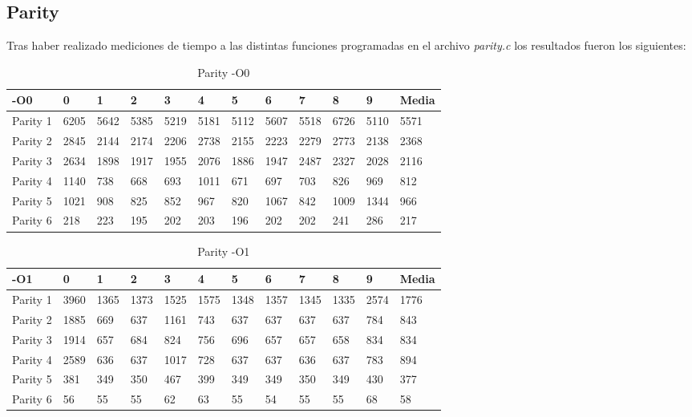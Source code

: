 \newpage

\subsection*{Parity}

\begin{flushleft}
  Tras haber realizado mediciones de tiempo a las distintas funciones
  programadas en el archivo \textit{parity.c} los resultados fueron los
  siguientes:
\end{flushleft}

\begin{table}[!htbp]
\centering
\caption{Parity -O0}
\label{my-label}
\begin{tabular}{|l|l|l|l|l|l|l|l|l|l|l|l|}\hline
-O0      & 0    & 1    & 2    & 3    & 4    & 5    & 6    & 7    & 8    & 9    & Media \\\hline
Parity 1 & 6205 & 5642 & 5385 & 5219 & 5181 & 5112 & 5607 & 5518 & 6726 & 5110 & 5571  \\\hline
Parity 2 & 2845 & 2144 & 2174 & 2206 & 2738 & 2155 & 2223 & 2279 & 2773 & 2138 & 2368  \\\hline
Parity 3 & 2634 & 1898 & 1917 & 1955 & 2076 & 1886 & 1947 & 2487 & 2327 & 2028 & 2116  \\\hline
Parity 4 & 1140 & 738  & 668  & 693  & 1011 & 671  & 697  & 703  & 826  & 969  & 812   \\\hline
Parity 5 & 1021 & 908  & 825  & 852  & 967  & 820  & 1067 & 842  & 1009 & 1344 & 966   \\\hline
Parity 6 & 218  & 223  & 195  & 202  & 203  & 196  & 202  & 202  & 241  & 286  & 217   \\\hline
\end{tabular}
\end{table}

\begin{table}[!htbp]
\centering
\caption{Parity -O1}
\label{my-label}
\begin{tabular}{|l|l|l|l|l|l|l|l|l|l|l|l|}\hline
-O1      & 0    & 1    & 2    & 3    & 4    & 5    & 6    & 7    & 8    & 9    & Media \\\hline
Parity 1 & 3960 & 1365 & 1373 & 1525 & 1575 & 1348 & 1357 & 1345 & 1335 & 2574 & 1776  \\\hline
Parity 2 & 1885 & 669  & 637  & 1161 & 743  & 637  & 637  & 637  & 637  & 784  & 843   \\\hline
Parity 3 & 1914 & 657  & 684  & 824  & 756  & 696  & 657  & 657  & 658  & 834  & 834   \\\hline
Parity 4 & 2589 & 636  & 637  & 1017 & 728  & 637  & 637  & 636  & 637  & 783  & 894   \\\hline
Parity 5 & 381  & 349  & 350  & 467  & 399  & 349  & 349  & 350  & 349  & 430  & 377   \\\hline
Parity 6 & 56   & 55   & 55   & 62   & 63   & 55   & 54   & 55   & 55   & 68   & 58    \\\hline
\end{tabular}
\end{table}

